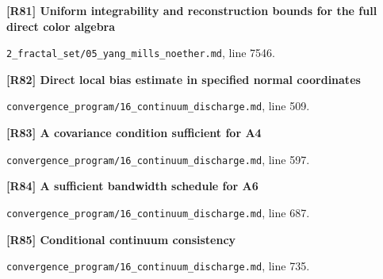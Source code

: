 \documentclass[11pt,a4paper]{article}
\begin{document}
\par\medskip\noindent\begin{minipage}{\linewidth}\textbf{[R81] Uniform integrability and reconstruction bounds for the full direct color algebra}\label{src:lem-ym-physical-gauge-word-uniform-integrability}\par
{\small\texttt{}\par
\nolinkurl{2_fractal_set/05_yang_mills_noether.md}, line 7546.\par}
\end{minipage}\par

\par\medskip\noindent\begin{minipage}{\linewidth}\textbf{[R82] Direct local bias estimate in specified normal coordinates}\label{src:lem-continuum-local-bias}\par
{\small\texttt{}\par
\nolinkurl{convergence_program/16_continuum_discharge.md}, line 509.\par}
\end{minipage}\par

\par\medskip\noindent\begin{minipage}{\linewidth}\textbf{[R83] A covariance condition sufficient for A4}\label{src:lem-continuum-a4-mixing}\par
{\small\texttt{}\par
\nolinkurl{convergence_program/16_continuum_discharge.md}, line 597.\par}
\end{minipage}\par

\par\medskip\noindent\begin{minipage}{\linewidth}\textbf{[R84] A sufficient bandwidth schedule for A6}\label{src:lem-continuum-a6-scaling}\par
{\small\texttt{}\par
\nolinkurl{convergence_program/16_continuum_discharge.md}, line 687.\par}
\end{minipage}\par

\par\medskip\noindent\begin{minipage}{\linewidth}\textbf{[R85] Conditional continuum consistency}\label{src:cor-continuum-consistency-conditional}\par
{\small\texttt{}\par
\nolinkurl{convergence_program/16_continuum_discharge.md}, line 735.\par}
\end{minipage}\par
\end{document}
